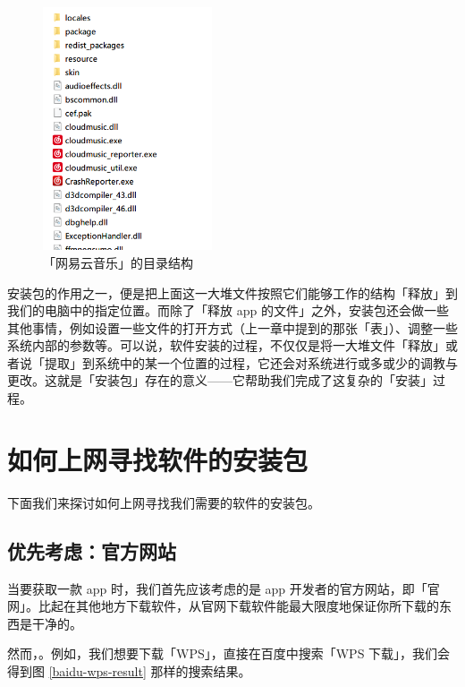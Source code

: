 \begin{figure}[htb!]
  \centering
  \includegraphics[width=5cm]{assets/Netease_cloud_music_files.png}
  \caption{「网易云音乐」的目录结构}
  \label{ncm-files}
\end{figure}

安装包的作用之一，便是把上面这一大堆文件按照它们能够工作的结构「释放」到我们的电脑中的指定位置。而除了「释放 app 的文件」之外，安装包还会做一些其他事情，例如设置一些文件的打开方式（上一章中提到的那张「表」）、调整一些系统内部的参数等。可以说，软件安装的过程，不仅仅是将一大堆文件「释放」或者说「提取」到系统中的某一个位置的过程，它还会对系统进行或多或少的调教与更改。这就是「安装包」存在的意义——它帮助我们完成了这复杂的「安装」过程。

\section{如何上网寻找软件的安装包}

下面我们来探讨如何上网寻找我们需要的软件的安装包。

\subsection{优先考虑：官方网站}

当要获取一款 app 时，我们首先应该考虑的是 app 开发者的官方网站，即「官网」。比起在其他地方下载软件，从官网下载软件能最大限度地保证你所下载的东西是干净的。

然而，。例如，我们想要下载「WPS」，直接在百度中搜索「WPS 下载」，我们会得到图 \ref{baidu-wps-result} 那样的搜索结果。

